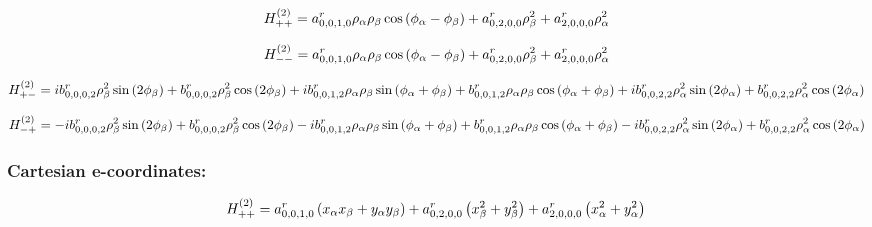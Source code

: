 \documentclass[fleqn]{article}
\begin{document}
\begin{dmath*}
H_{++}^{(2)}=a^{r}_{0,0,1,0} \rho_{\alpha} \rho_{\beta} \cos{\left (\phi_{\alpha} - \phi_{\beta} \right )} + a^{r}_{0,2,0,0} \rho_{\beta}^{2} + a^{r}_{2,0,0,0} \rho_{\alpha}^{2}\\
\end{dmath*}

\begin{dmath*}
H_{--}^{(2)}=a^{r}_{0,0,1,0} \rho_{\alpha} \rho_{\beta} \cos{\left (\phi_{\alpha} - \phi_{\beta} \right )} + a^{r}_{0,2,0,0} \rho_{\beta}^{2} + a^{r}_{2,0,0,0} \rho_{\alpha}^{2}\\
\end{dmath*}

\begin{dmath*}
H_{+-}^{(2)}= i b^{r}_{0,0,0,2} \rho_{\beta}^{2} \sin{\left (2 \phi_{\beta} \right )} + b^{r}_{0,0,0,2} \rho_{\beta}^{2} \cos{\left (2 \phi_{\beta} \right )} +  i b^{r}_{0,0,1,2} \rho_{\alpha} \rho_{\beta} \sin{\left (\phi_{\alpha} + \phi_{\beta} \right )} + b^{r}_{0,0,1,2} \rho_{\alpha} \rho_{\beta} \cos{\left (\phi_{\alpha} + \phi_{\beta} \right )} +  i b^{r}_{0,0,2,2} \rho_{\alpha}^{2} \sin{\left (2 \phi_{\alpha} \right )} + b^{r}_{0,0,2,2} \rho_{\alpha}^{2} \cos{\left (2 \phi_{\alpha} \right )}\\
\end{dmath*}

\begin{dmath*}
H_{-+}^{(2)}=-  i b^{r}_{0,0,0,2} \rho_{\beta}^{2} \sin{\left (2 \phi_{\beta} \right )} + b^{r}_{0,0,0,2} \rho_{\beta}^{2} \cos{\left (2 \phi_{\beta} \right )} -  i b^{r}_{0,0,1,2} \rho_{\alpha} \rho_{\beta} \sin{\left (\phi_{\alpha} + \phi_{\beta} \right )} + b^{r}_{0,0,1,2} \rho_{\alpha} \rho_{\beta} \cos{\left (\phi_{\alpha} + \phi_{\beta} \right )} -  i b^{r}_{0,0,2,2} \rho_{\alpha}^{2} \sin{\left (2 \phi_{\alpha} \right )} + b^{r}_{0,0,2,2} \rho_{\alpha}^{2} \cos{\left (2 \phi_{\alpha} \right )}\\
\end{dmath*}
\subsubsection*{Cartesian e-coordinates:}

\begin{dmath*}
H_{++}^{(2)}=a^{r}_{0,0,1,0} \left(x_{\alpha} x_{\beta} + y_{\alpha} y_{\beta}\right) + a^{r}_{0,2,0,0} \left(x_{\beta}^{2} + y_{\beta}^{2}\right) + a^{r}_{2,0,0,0} \left(x_{\alpha}^{2} + y_{\alpha}^{2}\right)\\
\end{dmath*}
\end{document}
